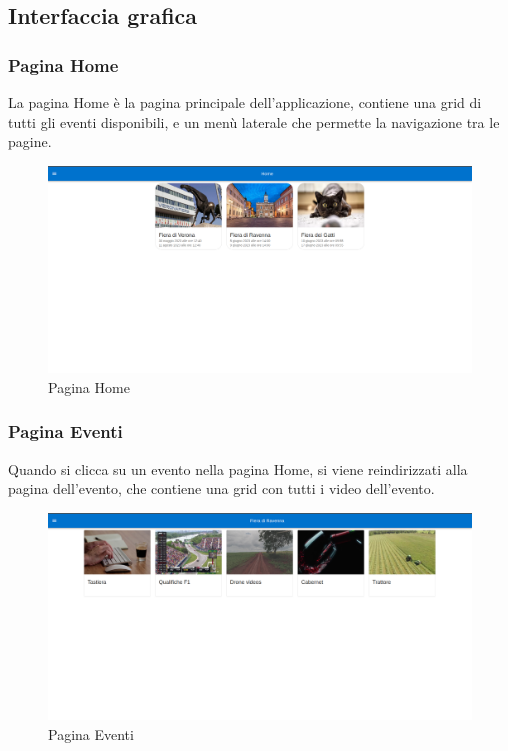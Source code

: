\subsection{Interfaccia grafica}
\subsubsection{Pagina Home}
La pagina Home è la pagina principale dell'applicazione, contiene una grid di tutti gli eventi disponibili, e un menù laterale che permette la navigazione tra le pagine.\\
\begin{figure}[H]
    \centering
    \includegraphics[width=1\textwidth]{images/interface/home.png}
    \caption{Pagina Home}
    \label{fig:home}
\end{figure}
\subsubsection{Pagina Eventi}
Quando si clicca su un evento nella pagina Home, si viene reindirizzati alla pagina dell'evento, che contiene una grid con tutti i video dell'evento.\\
\begin{figure}[H]
    \centering
    \includegraphics[width=1\textwidth]{images/interface/events.png}
    \caption{Pagina Eventi}
    \label{fig:eventi}
\end{figure}
